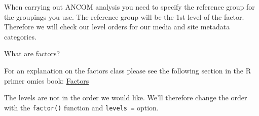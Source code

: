 \documentclass[
]{book}
\newenvironment{Shaded}{\begin{snugshade}}{\end{snugshade}}
\newcommand{\AttributeTok}[1]{\textcolor[rgb]{0.13,0.29,0.53}{#1}}
\newcommand{\CommentTok}[1]{\textcolor[rgb]{0.56,0.35,0.01}{\textit{#1}}}
\newcommand{\FunctionTok}[1]{\textcolor[rgb]{0.13,0.29,0.53}{\textbf{#1}}}
\newcommand{\NormalTok}[1]{#1}
\newcommand{\OtherTok}[1]{\textcolor[rgb]{0.56,0.35,0.01}{#1}}
\newcommand{\SpecialCharTok}[1]{\textcolor[rgb]{0.81,0.36,0.00}{\textbf{#1}}}
\newcommand{\StringTok}[1]{\textcolor[rgb]{0.31,0.60,0.02}{#1}}
\begin{document}
When carrying out ANCOM analysis you need to specify the reference group for the groupings you use.
The reference group will be the 1st level of the factor.
Therefore we will check our level orders for our media and site metadata categories.

What are factors?

For an explanation on the factors class please see the following section in the R primer omics book:
\href{https://neof-workshops.github.io/R_j4c0xh/14-Plots_scatterplot_and_box_plots.html\#factors}{Factors}

\begin{Shaded}
\end{Shaded}

The levels are not in the order we would like.
We'll therefore change the order with the \texttt{factor()} function and \texttt{levels\ =} option.

\begin{Shaded}
\end{Shaded}
\end{document}
